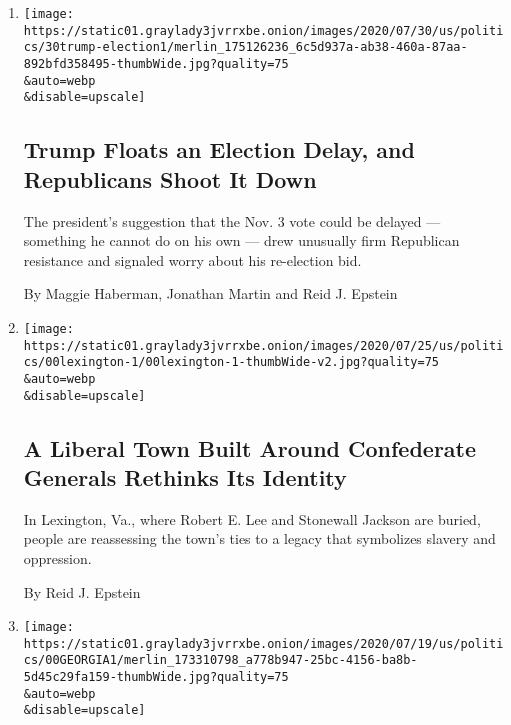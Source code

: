 \begin{enumerate}
\def\labelenumi{\arabic{enumi}.}
\item
  \href{/2020/07/30/us/politics/trump-delay-2020-election.html}{}

  \texttt{[image: https://static01.graylady3jvrrxbe.onion/images/2020/07/30/us/politics/30trump-election1/merlin\_175126236\_6c5d937a-ab38-460a-87aa-892bfd358495-thumbWide.jpg?quality=75\\\&auto=webp\\\&disable=upscale]}

  \hypertarget{trump-floats-an-election-delay-and-republicans-shoot-it-down}{%
  \subsection{Trump Floats an Election Delay, and Republicans Shoot It
  Down}\label{trump-floats-an-election-delay-and-republicans-shoot-it-down}}

  The president's suggestion that the Nov. 3 vote could be delayed ---
  something he cannot do on his own --- drew unusually firm Republican
  resistance and signaled worry about his re-election bid.

  By Maggie Haberman, Jonathan Martin and Reid J. Epstein
\item
  \href{/2020/07/26/us/politics/lexington-va-confederate-generals.html}{}

  \texttt{[image: https://static01.graylady3jvrrxbe.onion/images/2020/07/25/us/politics/00lexington-1/00lexington-1-thumbWide-v2.jpg?quality=75\\\&auto=webp\\\&disable=upscale]}

  \hypertarget{a-liberal-town-built-around-confederate-generals-rethinks-its-identity}{%
  \subsection{A Liberal Town Built Around Confederate Generals Rethinks
  Its
  Identity}\label{a-liberal-town-built-around-confederate-generals-rethinks-its-identity}}

  In Lexington, Va., where Robert E. Lee and Stonewall Jackson are
  buried, people are reassessing the town's ties to a legacy that
  symbolizes slavery and oppression.

  By Reid J. Epstein
\item
  \href{/2020/07/25/us/politics/georgia-election-voting-problems.html}{}

  \texttt{[image: https://static01.graylady3jvrrxbe.onion/images/2020/07/19/us/politics/00GEORGIA1/merlin\_173310798\_a778b947-25bc-4156-ba8b-5d45c29fa159-thumbWide.jpg?quality=75\\\&auto=webp\\\&disable=upscale]}


\end{enumerate}
